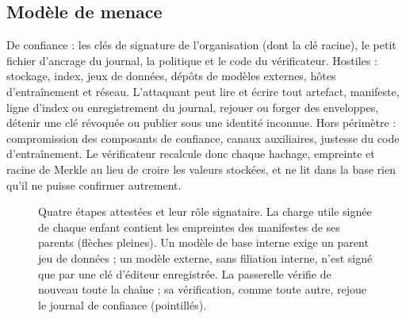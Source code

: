 \documentclass[conference]{IEEEtran}
\newcommand{\role}[1]{{\fontsize{4.6}{5.2}\selectfont\ttfamily #1}}
\begin{document}
\subsection{Modèle de menace}
De confiance : les clés de signature de l'organisation (dont la clé racine), le petit fichier d'ancrage du journal, la politique et le code du vérificateur. Hostiles : stockage, index, jeux de données, dépôts de modèles externes, hôtes d'entraînement et réseau. L'attaquant peut lire et écrire tout artefact, manifeste, ligne d'index ou enregistrement du journal, rejouer ou forger des enveloppes, détenir une clé révoquée ou publier sous une identité inconnue. Hors périmètre : compromission des composants de confiance, canaux auxiliaires, justesse du code d'entraînement. Le vérificateur recalcule donc chaque hachage, empreinte et racine de Merkle au lieu de croire les valeurs stockées, et ne lit dans la base rien qu'il ne puisse confirmer autrement.

\begin{figure}[t]
\centering
{}
\caption{Quatre étapes attestées et leur rôle signataire. La charge utile signée de chaque enfant contient les empreintes des manifestes de ses parents (flèches pleines). Un modèle de base interne exige un parent jeu de données ; un modèle externe, sans filiation interne, n'est signé que par une clé d'éditeur enregistrée. La passerelle vérifie de nouveau toute la chaîne ; sa vérification, comme toute autre, rejoue le journal de confiance (pointillés).}
\label{fig:arch}
\end{figure}
\end{document}

